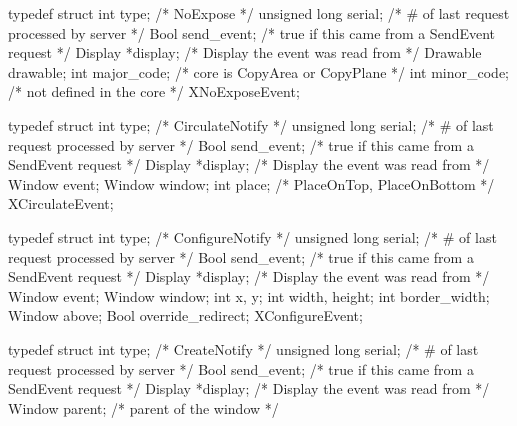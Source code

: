 \documentclass{report}
\begin{document}
\begin{itemize}
\begin{cppcode}
                typedef struct {
                    int type;               /* NoExpose */
                    unsigned long serial;   /* # of last request processed by server */
                    Bool send_event;        /* true if this came from a SendEvent request */
                    Display *display;       /* Display the event was read from */
                    Drawable drawable;
                    int major_code;         /* core is CopyArea or CopyPlane */
                    int minor_code;         /* not defined in the core */
                } XNoExposeEvent;
            \end{cppcode}
            \begin{cppcode}
                typedef struct {
                    int type;               /* CirculateNotify */
                    unsigned long serial;   /* # of last request processed by server */
                    Bool send_event;        /* true if this came from a SendEvent request */
                    Display *display;       /* Display the event was read from */
                    Window event;
                    Window window;
                    int place;              /* PlaceOnTop, PlaceOnBottom */
                } XCirculateEvent;
            \end{cppcode}
            \begin{cppcode}
                typedef struct {
                    int type;               /* ConfigureNotify */
                    unsigned long serial;   /* # of last request processed by server */
                    Bool send_event;        /* true if this came from a SendEvent request */
                    Display *display;       /* Display the event was read from */
                    Window event;
                    Window window;
                    int x, y;
                    int width, height;
                    int border_width;
                    Window above;
                    Bool override_redirect;
                } XConfigureEvent;
            \end{cppcode}
            \begin{cppcode}
                typedef struct {
                    int type;                   /* CreateNotify */
                    unsigned long serial;       /* # of last request processed by server */
                    Bool send_event;            /* true if this came from a SendEvent request */
                    Display *display;           /* Display the event was read from */
                    Window parent;              /* parent of the window */
}
\end{cppcode}
\end{itemize}
\end{document}
